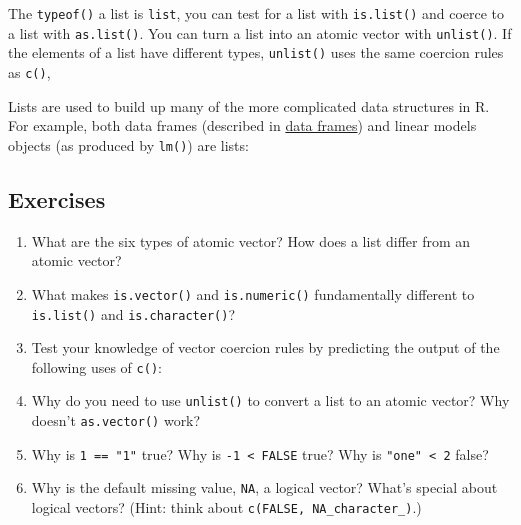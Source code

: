 The \texttt{typeof()} a list is \texttt{list}, you can test for a list
with \texttt{is.list()} and coerce to a list with \texttt{as.list()}.
You can turn a list into an atomic vector with \texttt{unlist()}. If the
elements of a list have different types, \texttt{unlist()} uses the same
coercion rules as \texttt{c()},

Lists are used to build up many of the more complicated data structures
in R. For example, both data frames (described in
\hyperref[data-frames]{data frames}) and linear models objects (as
produced by \texttt{lm()}) are lists:

\begin{Shaded}
\begin{Highlighting}[]

\StringTok{ }\StringTok{ } 
\end{Highlighting}
\end{Shaded}

\subsection{Exercises}\label{exercises}

\begin{enumerate}
\def\labelenumi{\arabic{enumi}.}
\item
  What are the six types of atomic vector? How does a list differ from
  an atomic vector?
\item
  What makes \texttt{is.vector()} and \texttt{is.numeric()}
  fundamentally different to \texttt{is.list()} and
  \texttt{is.character()}?
\item
  Test your knowledge of vector coercion rules by predicting the output
  of the following uses of \texttt{c()}:

\begin{Shaded}
\begin{Highlighting}[]
\NormalTok{(}\NormalTok{, }\NormalTok{)}
\NormalTok{(}\NormalTok{, }\NormalTok{)}
\NormalTok{(}\NormalTok{(}\NormalTok{), }\NormalTok{)}
\NormalTok{(}
\end{Highlighting}
\end{Shaded}
\item
  Why do you need to use \texttt{unlist()} to convert a list to an
  atomic vector? Why doesn't \texttt{as.vector()} work?
\item
  Why is \texttt{1 == "1"} true? Why is \texttt{-1 \textless{} FALSE}
  true? Why is \texttt{"one" \textless{} 2} false?
\item
  Why is the default missing value, \texttt{NA}, a logical vector?
  What's special about logical vectors? (Hint: think about
  \texttt{c(FALSE, NA\_character\_)}.)
\end{enumerate}

